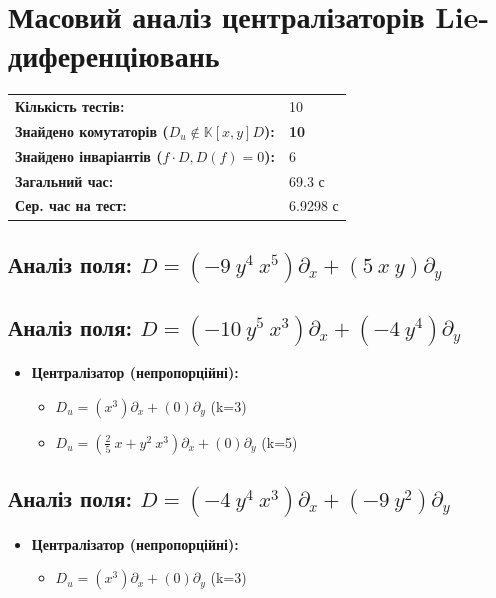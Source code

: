 \section*{Масовий аналіз централізаторів Lie-диференціювань}
\begin{tcolorbox}[colback=blue!5,colframe=blue!75,title=Метрики обчислень]
\begin{tabular}{ll}
\textbf{Кількість тестів:} & 10 \\
\textbf{Знайдено комутаторів ($D_u \notin \mathbb{K}[x,y]D$):} & \textbf{10} \\
\textbf{Знайдено інваріантів ($f \cdot D, D(f)=0$):} & 6 \\
\hline
\textbf{Загальний час:} & 69.3 с \\
\textbf{Сер. час на тест:} & 6.9298 с \\
\end{tabular}
\end{tcolorbox}

\subsection*{Аналіз поля: $ D = ( - 9 ~ y^{4} ~ x^{5})\partial_x + (5 ~ x ~ y)\partial_y $}
\begin{itemize}[leftmargin=1cm]
\end{itemize}
\hrulefill
\subsection*{Аналіз поля: $ D = ( - 10 ~ y^{5} ~ x^{3})\partial_x + ( - 4 ~ y^{4})\partial_y $}
\begin{itemize}[leftmargin=1cm]
  \item \textbf{Централізатор (непропорційні):}
    \begin{itemize}
      \item $ D_u = (x^{3})\partial_x + (0)\partial_y $ (k=3)
      \item $ D_u = (\frac{2}{5} ~ x + y^{2} ~ x^{3})\partial_x + (0)\partial_y $ (k=5)
    \end{itemize}
\end{itemize}
\hrulefill
\subsection*{Аналіз поля: $ D = ( - 4 ~ y^{4} ~ x^{3})\partial_x + ( - 9 ~ y^{2})\partial_y $}
\begin{itemize}[leftmargin=1cm]
  \item \textbf{Централізатор (непропорційні):}
    \begin{itemize}
      \item $ D_u = (x^{3})\partial_x + (0)\partial_y $ (k=3)
    \end{itemize}
\end{itemize}
\hrulefill
